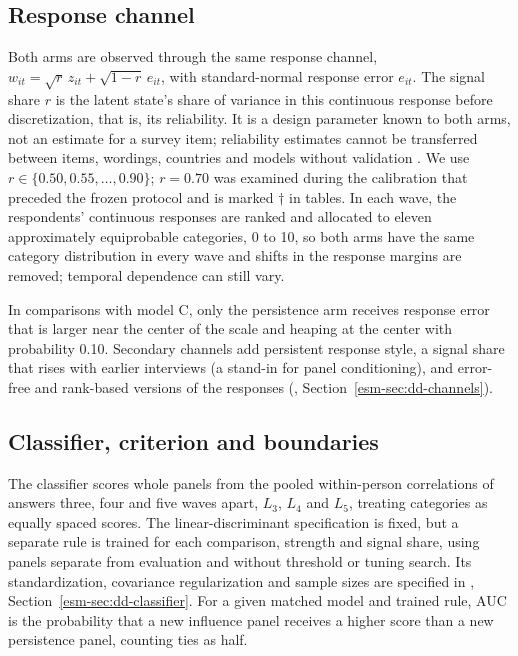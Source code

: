 \subsection{Response channel}\label{sec:methods-channel}

Both arms are observed through the same response channel, $w_{it}=\sqrt r\,z_{it}+\sqrt{1-r}\,e_{it}$, with standard-normal response error $e_{it}$. The signal share $r$ is the latent state's share of variance in this continuous response before discretization, that is, its reliability. It is a design parameter known to both arms, not an estimate for a survey item; reliability estimates cannot be transferred between items, wordings, countries and models without validation \cite{antoun2026,lucasdonnellan2012,alwinkrosnick1991reliability}. We use $r\in\{0.50,0.55,\ldots,0.90\}$; $r=0.70$ was examined during the calibration that preceded the frozen protocol and is marked $\dagger$ in tables. In each wave, the respondents' continuous responses are ranked and allocated to eleven approximately equiprobable categories, 0 to 10, so both arms have the same category distribution in every wave and shifts in the response margins are removed; temporal dependence can still vary.

In comparisons with model C, only the persistence arm receives response error that is larger near the center of the scale and heaping at the center with probability 0.10. Secondary channels add persistent response style, a signal share that rises with earlier interviews (a stand-in for panel conditioning), and error-free and rank-based versions of the responses (\esmresource, Section~\ref{esm-sec:dd-channels}).

\subsection{Classifier, criterion and boundaries}\label{sec:methods-classifier}

The classifier scores whole panels from the pooled within-person correlations of answers three, four and five waves apart, $L_3$, $L_4$ and $L_5$, treating categories as equally spaced scores. The linear-discriminant specification is fixed, but a separate rule is trained for each comparison, strength and signal share, using panels separate from evaluation and without threshold or tuning search. Its standardization, covariance regularization and sample sizes are specified in \esmresource, Section~\ref{esm-sec:dd-classifier}. For a given matched model and trained rule, AUC is the probability that a new influence panel receives a higher score than a new persistence panel, counting ties as half.


